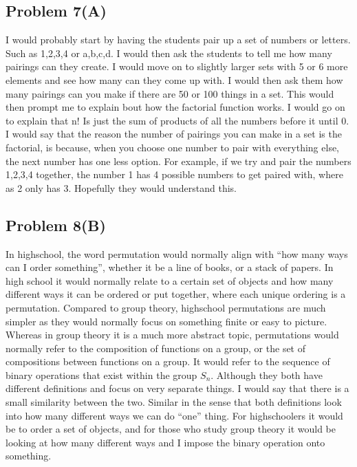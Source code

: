 \documentclass[12pt]{article}
\begin{document}
\subsection*{Problem 7(A)}
I would probably start by having the students pair up a set of numbers or letters. Such as {1,2,3,4} or {a,b,c,d}. I would then ask the students to tell me how many pairings can they create. I would move on to slightly larger sets with 5 or 6 more elements and see how many can they come up with. I would then ask them how many pairings can you make if there are 50 or 100 things in a set. This would then prompt me to explain bout how the factorial function works. I would go on to explain that n! Is just the sum of products of all the numbers before it until 0. I would say that the reason the number of pairings you can make in a set is the factorial, is because, when you choose one number to pair with everything else, the next number has one less option. For example, if we try and pair the numbers {1,2,3,4} together, the number 1 has 4 possible numbers to get paired with, where as 2 only has 3. Hopefully they would understand this.

\subsection*{Problem 8(B)}
In highschool, the word permutation would normally align with “how many ways can I order something”, whether it be a line of books, or a stack of papers. In high school it would normally relate to a certain set of objects and how many different ways it can be ordered or put together, where each unique ordering is a permutation. Compared to group theory, highschool permutations are much simpler as they would normally focus on something finite or easy to picture. Whereas in group theory it is a much more abstract topic, permutations would normally refer to the composition of functions on a group, or the set of compositions between functions on a group. It would refer to the sequence of binary operations that exist within the group $S_n$. Although they both have different definitions and focus on very separate things. I would say that there is a small similarity between the two. Similar in the sense that both definitions look into how many different ways we can do “one” thing. For highschoolers it would be to order a set of objects, and for those who study group theory it would be looking at how many different ways and I impose the binary operation onto something.
\end{document}
